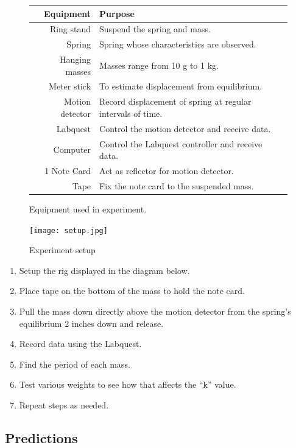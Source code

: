 \documentclass{article}
\numberwithin{figure}{section}
\numberwithin{table}{section}
\begin{document}
\begin{figure}[!hbp]
    \begin{tabular}{rl} 
        \toprule
        Equipment & Purpose \\
        \midrule
        Ring stand & Suspend the spring and mass. \\
        Spring & Spring whose characteristics are observed. \\
        Hanging masses & Masses range from 10 g to 1 kg. \\
        Meter stick & To estimate displacement from equilibrium. \\
        Motion detector & Record displacement of spring at regular intervals of time. \\
        Labquest & Control the motion detector and receive data. \\
        Computer & Control the Labquest controller and receive data. \\
        1 Note Card & Act as reflector for motion detector. \\
        Tape & Fix the note card to the suspended mass. \\ 
        \bottomrule
    \end{tabular} 
    \caption{Equipment used in experiment.} 
\end{figure} 


\begin{figure}[!hbp]
    \centering
    \texttt{[image: setup.jpg]}
    \caption{Experiment setup}
    \label{setup}
\end{figure} 



\begin{enumerate} 
	\item Setup the rig displayed in the diagram below.
	\item Place tape on the bottom of the mass to hold the note card.
	\item Pull the mass down directly above the motion detector from the spring’s equilibrium 2 inches down and release.
	\item Record data using the Labquest.
	\item Find the period of each mass.
	\item Test various weights to see how that affects the “k” value.
	\item Repeat steps as needed. 
\end{enumerate} 



\subsection{Predictions} 
\end{document}
